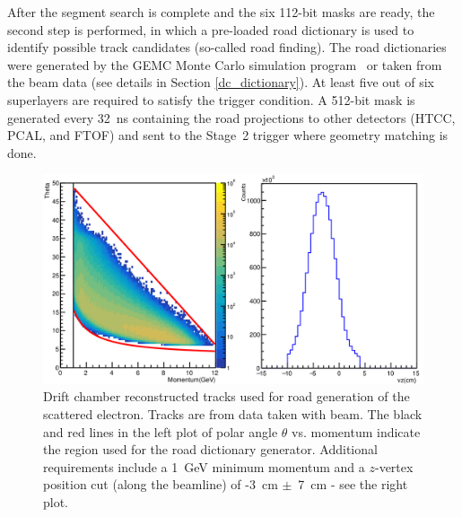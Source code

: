 After the segment search is complete and the six 112-bit masks are ready, the second step is performed, in
which a pre-loaded road dictionary is used to identify possible track candidates (so-called road finding). The
road dictionaries were generated by the GEMC Monte Carlo simulation program~\cite{gemc-ref} or taken from
the beam data (see details in Section \ref{dc_dictionary}). At least five out of six superlayers are required
to satisfy the trigger condition. A 512-bit mask is generated every 32~ns containing the road projections to
other detectors (HTCC, PCAL, and FTOF) and sent to the Stage~2 trigger where geometry matching is done.

\begin{figure}[hbt]
	\centering
	\includegraphics[width=1.0\columnwidth,keepaspectratio]{img/dc_roads_electrons_data.png}
	\caption{Drift chamber reconstructed tracks used for road generation of the scattered electron. Tracks
          are from data taken with beam. The black and red lines in the left plot of polar angle $\theta$ vs.
          momentum indicate the region used for the road dictionary generator. Additional requirements include a
          1~GeV minimum momentum and a $z$-vertex position cut (along the beamline) of -3~cm $\pm$~7~cm -
          see the right plot.}
	\label{fig:dc_roads_electrons_data}
\end{figure}

